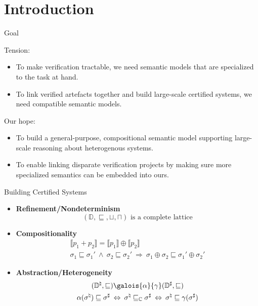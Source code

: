 \documentclass{beamer}
\begin{document}
\section{Introduction}

\begin{frame}{Goal} %

Tension:
\begin{itemize}
\item
  To make verification tractable,
  we need semantic models that are
  specialized to the task at hand.
\item 
  To link verified artefacts together and
  build large-scale certified systems,
  we need compatible semantic models.
\end{itemize}
\vfill

Our hope:
\begin{itemize}
\item
  To build a general-purpose, compositional
  semantic model supporting large-scale reasoning
  about heterogenous systems.
\item
  To enable linking disparate verification projects
  by making sure more specialized semantics
  can be embedded into ours.
\end{itemize}
\vfill

\end{frame}

\begin{frame}{Building Certified Systems} %
\small
\begin{center}
\end{center}
\begin{itemize}
\item \textbf{Refinement/Nondeterminism}
  \[ (\mathbb{D}, {\sqsubseteq}, {\sqcup}, {\sqcap})
     \mbox{ is a complete lattice} \]
\item \textbf{Compositionality}
  \begin{gather*}
    \llbracket p_1 + p_2 \rrbracket =
    \llbracket p_1 \rrbracket \oplus \llbracket p_2 \rrbracket
    \\
    \sigma_1 \sqsubseteq \sigma_1' \:\wedge\:
    \sigma_2 \sqsubseteq \sigma_2' \:\Rightarrow\:
    \sigma_1 \oplus \sigma_2 \sqsubseteq \sigma_1' \oplus \sigma_2'
  \end{gather*}
\item \textbf{Abstraction/Heterogeneity}
  \begin{gather*}
    (\mathbb{D}^\natural, {\sqsubseteq})
    \galois{\alpha}{\gamma}
    (\mathbb{D}^\sharp, {\sqsubseteq})
    \\
    \alpha(\sigma^\natural) \sqsubseteq \sigma^\sharp
    \: \Leftrightarrow \:
    \sigma^\natural \sqsubseteq_\mathbb{C} \sigma^\sharp
    \: \Leftrightarrow \:
    \sigma^\natural \sqsubseteq \gamma(\sigma^\sharp)
  \end{gather*}
\end{itemize}
\end{frame}
\end{document}
